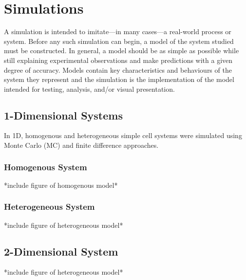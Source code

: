 \chapter{Simulations}

A simulation is intended to imitate---in many cases---a real-world process or system. Before any such simulation can begin, a model of the system studied must be constructed. In general, a model should be as simple as possible while still explaining experimental observations and make predictions with a given degree of accuracy. Models contain key characteristics and behaviours of the system they represent and the simulation is the implementation of the model intended for testing, analysis, and/or visual presentation. 





\section{1-Dimensional Systems}
In 1D, homogenous and heterogeneous simple cell systems were simulated using Monte Carlo (MC) and finite difference approaches. 

\subsection{Homogenous System}


*include figure of homogenous model*

\subsection{Heterogeneous System}


*include figure of heterogeneous model*

\section{2-Dimensional System}

*include figure of heterogeneous model*